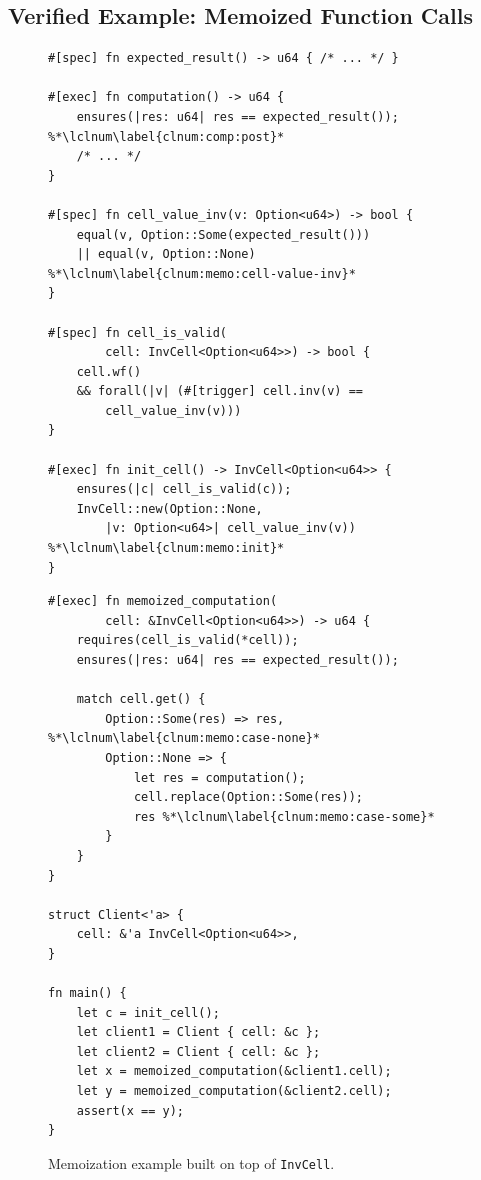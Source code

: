 
\subsection{Verified Example: Memoized Function Calls} \label{sec:memoize}

\begin{figure}

\noindent\begin{minipage}{.5\textwidth}

\begin{lstlisting}[language=Verus,style=VerusLineNos]
#[spec] fn expected_result() -> u64 { /* ... */ }

#[exec] fn computation() -> u64 {
    ensures(|res: u64| res == expected_result()); %*\lclnum\label{clnum:comp:post}*
    /* ... */
}

#[spec] fn cell_value_inv(v: Option<u64>) -> bool {
    equal(v, Option::Some(expected_result()))
    || equal(v, Option::None) %*\lclnum\label{clnum:memo:cell-value-inv}*
}

#[spec] fn cell_is_valid(
        cell: InvCell<Option<u64>>) -> bool {
    cell.wf()
    && forall(|v| (#[trigger] cell.inv(v) ==
        cell_value_inv(v)))
}

#[exec] fn init_cell() -> InvCell<Option<u64>> {
    ensures(|c| cell_is_valid(c));
    InvCell::new(Option::None,
        |v: Option<u64>| cell_value_inv(v)) %*\lclnum\label{clnum:memo:init}*
}
\end{lstlisting}
\end{minipage}\hfill
\noindent\begin{minipage}{.5\textwidth}

\begin{lstlisting}[language=Verus,style=VerusLineNos]
#[exec] fn memoized_computation(
        cell: &InvCell<Option<u64>>) -> u64 {
    requires(cell_is_valid(*cell));
    ensures(|res: u64| res == expected_result());

    match cell.get() {
        Option::Some(res) => res, %*\lclnum\label{clnum:memo:case-none}*
        Option::None => {
            let res = computation();
            cell.replace(Option::Some(res));
            res %*\lclnum\label{clnum:memo:case-some}*
        }
    }
}

struct Client<'a> {
    cell: &'a InvCell<Option<u64>>,
}

fn main() {
    let c = init_cell();
    let client1 = Client { cell: &c };
    let client2 = Client { cell: &c };
    let x = memoized_computation(&client1.cell);
    let y = memoized_computation(&client2.cell);
    assert(x == y);
}
\end{lstlisting}
\end{minipage}

    \caption{
        \label{fig:memoize}
        Memoization example built on top of \texttt{InvCell}. %
    }
\end{figure}

